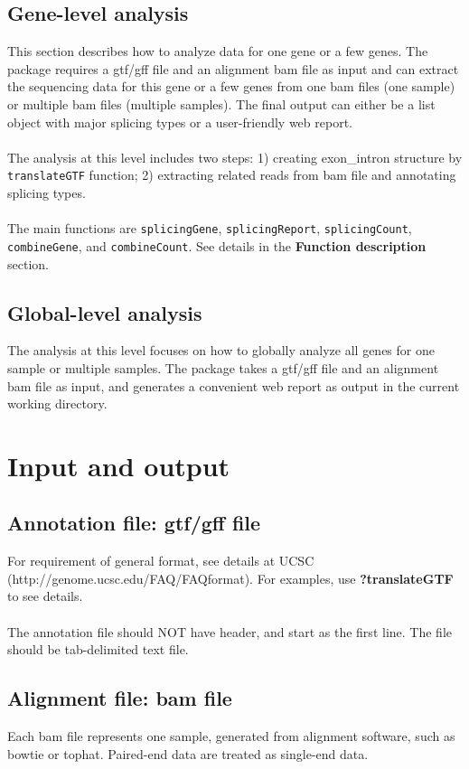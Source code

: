 \documentclass[a4paper]{article}
\begin{document}
\subsection{Gene-level analysis}
This section describes how to analyze data for one gene or a few genes. The package requires a gtf/gff file and an alignment bam file as input and can extract the sequencing data for this gene or a few genes from one bam files (one sample) or multiple bam files (multiple samples).  The final output can either be a list object with major splicing types or a user-friendly web report.
\\ \\
The analysis at this level includes two steps: 1) creating exon\_intron structure by \texttt{translateGTF} function; 2) extracting related reads from bam file and annotating splicing types.
\\ \\
The main functions are \texttt{splicingGene}, \texttt{splicingReport}, \texttt{splicingCount}, \texttt{combineGene}, and \texttt{combineCount}. See details in the \textbf{Function description} section.
\subsection{Global-level analysis}
The analysis at this level focuses on how to globally analyze all genes for one sample or multiple samples. The package takes a gtf/gff file and an alignment bam file as input, and generates a convenient web report as output in the current working directory.

\section{Input and output}
\subsection{Annotation file: gtf/gff file}
For requirement of general format, see details at UCSC (http://genome.ucsc.edu/FAQ/FAQformat). For examples,
use \textbf{?translateGTF} to see details.
\\ \\
The annotation file should NOT have header, and start as the first line. The file
should be tab-delimited text file.
\subsection{Alignment file: bam file}
Each bam file represents one sample, generated from alignment software, such as
bowtie or tophat. Paired-end data are treated as single-end data.
\end{document}
